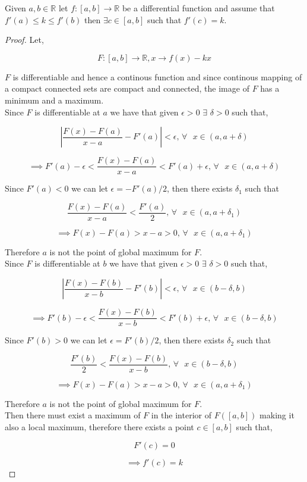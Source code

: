 \documentclass[11pt,a4paper]{colorart}
\def\l{\left}
\def\r{\right}
\def\d{{\delta}}
\def\R{\mathbb{R}}
\def\e{\epsilon}
\def\ra{\rightarrow}
\begin{document}
\begin{theorem}
	Given $a,b \in \R$ let $f:[a,b] \ra \R$ be a differential function and assume that $f'(a) \leq k \leq f'(b)$ then $\exists c \in [a,b]$ such that $f'(c) = k$.
\end{theorem}

\begin{proof}

	Let, 

	\[ F:[a,b] \ra \R, x \ra f(x) - kx \]

	$F$ is differentiable and hence a continous function and since continous mapping of a compact connected sets are compact and connected, the image of $F$ has a minimum and a maximum.\\

	Since $F$ is differentiable at $a$ we have that given $\e > 0$ $\exists$ $\d >0$ such that,

	\[ \l| \frac{ F(x) - F(a) }{ x - a } - F'(a) \r| < \e \text{, } \forall \text{ } x \in (a,a+\d) \]

	\[ \implies F'(a) - \e < \frac{ F(x) - F(a) }{ x - a } < F'(a) + \e \text{, } \forall \text{ } x \in (a,a+\d) \]

	Since $F'(a) < 0$ we can let $\e = -F'(a)/2$, then there exists $\d_1$ such that

	\[ \frac{ F(x) - F(a) }{ x - a } < \frac{ F'(a) }{ 2 } \text{, } \forall \text{ } x \in (a,a+\d_1) \]

	\[ \implies F(x) - F(a) > x - a > 0 \text{, } \forall \text{ } x \in (a,a+\d_1) \]

	Therefore $a$ is not the point of global maximum for $F$.\\
	
	Since $F$ is differentiable at $b$ we have that given $\e > 0$ $\exists$ $\d >0$ such that,

	\[ \l| \frac{ F(x) - F(b) }{ x - b } - F'(b) \r| < \e \text{, } \forall \text{ } x \in (b-\d,b) \]

	\[ \implies F'(b) - \e < \frac{ F(x) - F(b) }{ x - b } < F'(b) + \e \text{, } \forall \text{ } x \in (b-\d,b) \]

	Since $F'(b) > 0$ we can let $\e = F'(b)/2$, then there exists $\d_2$ such that

	\[ \frac{ F'(b) }{ 2 } < \frac{ F(x) - F(b) }{ x - b } \text{, } \forall \text{ } x \in (b-\d,b) \]

	\[ \implies F(x) - F(a) > x - a > 0 \text{, } \forall \text{ } x \in (a,a+\d_1) \]

	Therefore $a$ is not the point of global maximum for $F$.\\
	
	Then there must exist a maximum of $F$ in the interior of $F([a,b])$ making it also a local maximum, therefore there exists a point $c \in [a,b]$ such that,

	\[ F'(c) = 0 \]

	\[ \implies f'(c) = k \]

\end{proof}
\end{document}
